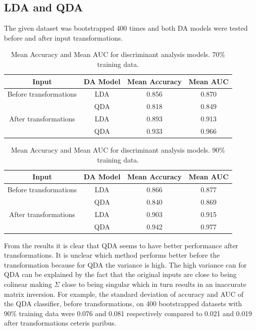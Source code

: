 \documentclass{article}
\begin{document}
\subsection{LDA and QDA}
The given dataset was bootstrapped 400 times and both DA models were tested before and after input transformations.
\begin{table}[h!]
	\centering
	\begin{tabular}{cccc}
		Input & DA Model & Mean Accuracy & Mean AUC \\
		\midrule
		Before transformations
		& LDA & 0.856 & 0.870 \\
	    & QDA & 0.818 & 0.849 \\
		\midrule
		After transformations
		& LDA & 0.893 & 0.913 \\
		& QDA & 0.933 & 0.966 \\
	\end{tabular}
	\caption{Mean Accuracy and Mean AUC for discriminant analysis models. 70\% training data.}
	\label{tab:discanal_table_70}
\end{table}
\begin{table}[h!]
	\centering
	\begin{tabular}{cccc}
		Input & DA Model & Mean Accuracy & Mean AUC \\
		\midrule
		Before transformations
		& LDA & 0.866 & 0.877 \\
	    & QDA & 0.840 & 0.869 \\
		\midrule
		After transformations
		& LDA & 0.903 & 0.915 \\
		& QDA & 0.942 & 0.977 \\
	\end{tabular}
	\caption{Mean Accuracy and Mean AUC for discriminant analysis models. 90\% training data.}
	\label{tab:discanal_table_90}
\end{table}
From the results it is clear that QDA seems to have better performance after transformations. It is unclear which method performs better before the transformation because for QDA the variance is high. The high variance can for QDA can be explained by the fact that the original inputs are close to being colinear making $\Sigma$ close to being singular which in turn results in an inaccurate matrix inversion. For example, the standard deviation of accuracy and AUC of the QDA classifier, before transformations, on 400 bootstrapped datasets with 90\% training data were 0.076 and 0.081 respectively compared to 0.021 and 0.019 after transformations ceteris paribus.
\end{document}
